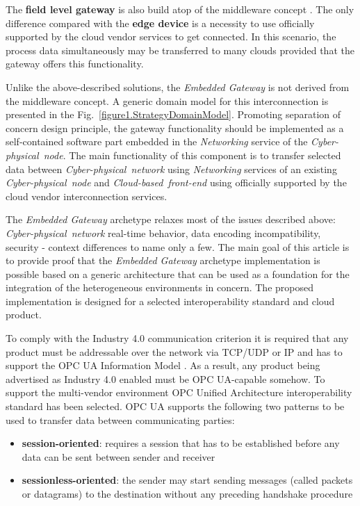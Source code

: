 \documentclass{article}
\begin{document}
The \textbf{field level gateway} is also build atop of the middleware concept \cite{Sunyaev2020}. The only difference compared with the \textbf{edge device} is a necessity to use officially supported by the cloud vendor services to get connected. In this scenario, the process data simultaneously may be transferred to many clouds provided that the gateway offers this functionality.

Unlike the above-described solutions, the \emph{Embedded Gateway} is not derived from the middleware concept. A generic domain model for this interconnection is presented in the Fig.~\ref{figure1.StrategyDomainModel}. Promoting separation of concern design principle, the gateway functionality should be implemented as a self-contained software part embedded in the \emph{Networking} service of the \emph{Cyber-physical\ node}. The main functionality of this component is to transfer selected data between \emph{Cyber-physical\ network} using \emph{Networking} services of an existing \emph{Cyber-physical\ node} and \emph{Cloud-based\ front-end} using officially supported by the cloud vendor interconnection services.

The \emph{Embedded Gateway} archetype relaxes most of the issues described above: \emph{Cyber-physical\ network} real-time behavior, data encoding incompatibility, security - context differences to name only a few. The main goal of this article is to provide proof that the \emph{Embedded Gateway} archetype implementation is possible based on a generic architecture that can be used as a foundation for the integration of the heterogeneous environments in concern. The proposed implementation is designed for a selected interoperability standard and cloud product.

To comply with the Industry 4.0 communication criterion it is required that any product must be addressable over the network via TCP/UDP \cite{RefWorks:doc:5d8e1874e4b0bc72a68f0d11} or IP \cite{RefWorks:doc:5ac86c98e4b009947bbb8730} and has to support the OPC UA Information Model \cite{OPCUAPart5, RefWorks:doc:5ac86c99e4b009947bbb87c9, RefWorks:doc:5d986a28e4b0b0c862c0d184}. As a result, any product being advertised as Industry 4.0 enabled must be OPC UA-capable somehow. To support the multi-vendor environment OPC Unified Architecture interoperability standard has been selected. OPC UA supports the following two patterns to be used to transfer data between communicating parties:

\begin{itemize}
      \item \textbf{session-oriented}: requires a session that has to be established before any data can be sent between sender and receiver
      \item \textbf{sessionless-oriented}: the sender may start sending messages (called packets or datagrams) to the destination without any preceding handshake procedure
\end{itemize}
\end{document}
